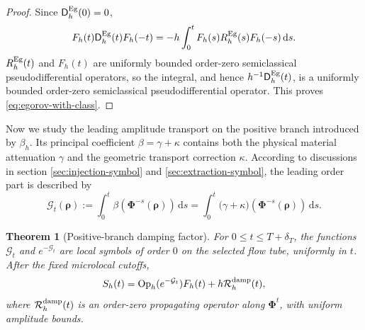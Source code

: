 \documentclass[11pt,reqno]{amsart}
\newtheorem{theorem}{Theorem}[section]
\newcommand{\dd}{\,\mathrm{d}}
\newcommand{\Op}{\operatorname{Op}}
\numberwithin{equation}{section}
\begin{document}
\begin{proof}
Since $\mathsf D_h^{\rm Eg}(0)=0$,   
\begin{equation*}
    F_h(t)\mathsf D_h^{\rm Eg}(t)F_h(-t)=-h\int_0^tF_h(s)R_h^{\rm Eg}(s)F_h(-s)\dd s.
\end{equation*}
$R_h^{\rm Eg}(t)$ and $F_h(t)$ are uniformly bounded order-zero semiclassical pseudodifferential operators, so the integral, and hence $h^{-1}\mathsf D_h^{\rm Eg}(t)$, is a uniformly bounded order-zero semiclassical pseudodifferential operator. This proves \eqref{eq:egorov-with-class}.
\end{proof}


Now we study the leading amplitude transport on the positive branch introduced by $\beta_h$. Its principal coefficient $\beta=\gamma+\kappa$ contains both the physical material attenuation $\gamma$ and the geometric transport correction $\kappa$. According to discussions in section \ref{sec:injection-symbol} and \ref{sec:extraction-symbol}, the leading order part is described by
\begin{equation}\label{eq:damping-integral}
    \mathcal G_t(\bm{\rho}) := \int_0^t \beta(\bm{\Phi}^{-s}(\bm{\rho}))\dd s = \int_0^t\bigl(\gamma+\kappa\bigr)(\bm{\Phi}^{-s}(\bm{\rho}))\dd s.
\end{equation}

\begin{theorem}[Positive-branch damping factor]
For $0\le t\le T+\delta_T$, the functions $\mathcal G_t$ and $e^{-\mathcal G_t}$ are local symbols of order $0$ on the selected flow tube, uniformly in $t$. After the fixed microlocal cutoffs,
\begin{equation}\label{eq:damped-factorization}
    S_h(t)=\Op_h(e^{-\mathcal G_t})F_h(t)+h\mathcal R_h^{\rm damp}(t),
\end{equation}
where $\mathcal R_h^{\rm damp}(t)$ is an order-zero propagating operator along $\bm\Phi^t$, with uniform amplitude bounds. 
\end{theorem}
\end{document}
